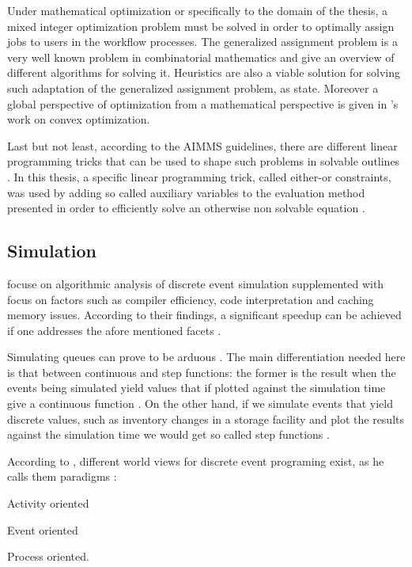 \documentclass[draft=false]{seal_thesis}
\begin{document}
Under mathematical optimization or specifically to the domain of the thesis, a mixed integer optimization problem must be solved in order to optimally assign jobs to users in the workflow processes. The generalized assignment problem is a very well known problem in combinatorial mathematics and \citet{Cattrysse1992} give an overview of different algorithms for solving it. Heuristics are also a viable solution for solving such adaptation of the generalized assignment problem, as \citet{Racer1994} state. Moreover a global perspective of optimization from a mathematical perspective is given in \citet{Boyd2004}'s work on convex optimization.

Last but not least, according to the AIMMS guidelines, there are different linear programming tricks that can be used to shape such problems in solvable outlines \citep{Bisschop2016}. In this thesis, a specific linear programming trick, called either-or constraints, was used by adding so called auxiliary variables to the evaluation method presented in order to efficiently solve an otherwise non solvable equation \citep[p. 77]{Bisschop2016}.

\subsection{Simulation}

\citet{Bahouth2007} focuse on algorithmic analysis of discrete event simulation supplemented with focus on factors such as compiler efficiency, code interpretation and caching memory issues. According to their findings, a significant speedup can be achieved if one addresses the afore mentioned facets \citep{Bahouth2007}.

Simulating queues can prove to be arduous \citep{Matloff2008}. The main differentiation needed here is that between continuous and step functions: the former is the result when the events being simulated yield values that if plotted against the simulation time give a continuous function \citep{Matloff2008}. On the other hand, if we simulate events that yield discrete values, such as inventory changes in a storage facility and plot the results against the simulation time we would get so called step functions \citep{Matloff2008}.

According to \citet{Matloff2008}, different world views for discrete event programing exist, as he calls them paradigms \citep{Matloff2008}:
\begin{enumerate*}
	\item Activity oriented
	\item Event oriented
	\item Process oriented.
\end{enumerate*}
\end{document}
